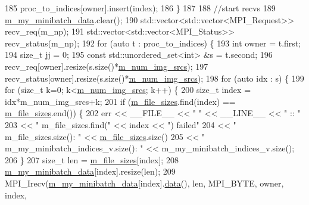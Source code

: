 \begin{DoxyCode}
185     proc\_to\_indices[owner].insert(index);
186   \}
187   
188   \textcolor{comment}{//start recvs}
189   \hyperlink{classlbann_1_1data__store__image_a627a08479de191dcef74e633c4cded8c}{m\_my\_minibatch\_data}.clear();
190   std::vector<std::vector<MPI\_Request>> recv\_req(m\_np);
191   std::vector<std::vector<MPI\_Status>> recv\_status(m\_np);
192   \textcolor{keywordflow}{for} (\textcolor{keyword}{auto} t : proc\_to\_indices) \{
193     \textcolor{keywordtype}{int} owner = t.first;
194     \textcolor{keywordtype}{size\_t} jj = 0;
195     \textcolor{keyword}{const} std::unordered\_set<int> &s = t.second;
196     recv\_req[owner].resize(s.size()*\hyperlink{classlbann_1_1data__store__image_a2f660053e7621a9cc70a7c4eef53c9cc}{m\_num\_img\_srcs});
197     recv\_status[owner].resize(s.size()*\hyperlink{classlbann_1_1data__store__image_a2f660053e7621a9cc70a7c4eef53c9cc}{m\_num\_img\_srcs});
198     \textcolor{keywordflow}{for} (\textcolor{keyword}{auto} idx : s) \{
199       \textcolor{keywordflow}{for} (\textcolor{keywordtype}{size\_t} k=0; k<\hyperlink{classlbann_1_1data__store__image_a2f660053e7621a9cc70a7c4eef53c9cc}{m\_num\_img\_srcs}; k++) \{
200         \textcolor{keywordtype}{size\_t} index = idx*m\_num\_img\_srcs+k;
201         \textcolor{keywordflow}{if} (\hyperlink{classlbann_1_1data__store__image_a1903176a4b305fd42617ea1cb6d997ae}{m\_file\_sizes}.find(index) == \hyperlink{classlbann_1_1data__store__image_a1903176a4b305fd42617ea1cb6d997ae}{m\_file\_sizes}.end()) \{
202           err << \_\_FILE\_\_ << \textcolor{stringliteral}{" "} << \_\_LINE\_\_ << \textcolor{stringliteral}{" :: "}
203               << \textcolor{stringliteral}{" m\_file\_sizes.find("} << index << \textcolor{stringliteral}{") failed"}
204               << \textcolor{stringliteral}{" m\_file\_sizes.size(): "} << \hyperlink{classlbann_1_1data__store__image_a1903176a4b305fd42617ea1cb6d997ae}{m\_file\_sizes}.size()
205               << \textcolor{stringliteral}{" m\_my\_minibatch\_indices\_v.size(): "} << m\_my\_minibatch\_indices\_v.size();
206         \}
207         \textcolor{keywordtype}{size\_t} len = \hyperlink{classlbann_1_1data__store__image_a1903176a4b305fd42617ea1cb6d997ae}{m\_file\_sizes}[index];
208         \hyperlink{classlbann_1_1data__store__image_a627a08479de191dcef74e633c4cded8c}{m\_my\_minibatch\_data}[index].resize(len);
209         MPI\_Irecv(\hyperlink{classlbann_1_1data__store__image_a627a08479de191dcef74e633c4cded8c}{m\_my\_minibatch\_data}[index].\hyperlink{namespacelbann_1_1cnpy__utils_a9ac86d96ccb1f8b4b2ea16441738781f}{data}(), len, MPI\_BYTE, owner, index, 

\end{DoxyCode}
